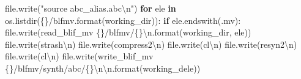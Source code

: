 \documentclass[
  italian,
]{book}
\newenvironment{Shaded}{\begin{snugshade}}{\end{snugshade}}
\newcommand{\BuiltInTok}[1]{#1}
\newcommand{\CharTok}[1]{\textcolor[rgb]{0.31,0.60,0.02}{#1}}
\newcommand{\ControlFlowTok}[1]{\textcolor[rgb]{0.13,0.29,0.53}{\textbf{#1}}}
\newcommand{\KeywordTok}[1]{\textcolor[rgb]{0.13,0.29,0.53}{\textbf{#1}}}
\newcommand{\NormalTok}[1]{#1}
\newcommand{\SpecialCharTok}[1]{\textcolor[rgb]{0.00,0.00,0.00}{#1}}
\newcommand{\StringTok}[1]{\textcolor[rgb]{0.31,0.60,0.02}{#1}}
\begin{document}
\begin{Shaded}
\begin{Highlighting}[]
    \BuiltInTok{file}\NormalTok{.write(}\StringTok{"source abc\_alias.abc}\CharTok{\textbackslash{}n}\StringTok{"}\NormalTok{)}
    \ControlFlowTok{for}\NormalTok{ ele }\KeywordTok{in}\NormalTok{ os.listdir(}\StringTok{\textquotesingle{}}\SpecialCharTok{\{\}}\StringTok{/blfmv\textquotesingle{}}\NormalTok{.}\BuiltInTok{format}\NormalTok{(working\_dir)):}
      \ControlFlowTok{if}\NormalTok{ ele.endswith(}\StringTok{\textquotesingle{}.mv\textquotesingle{}}\NormalTok{):}
        \BuiltInTok{file}\NormalTok{.write(}\StringTok{\textquotesingle{}read\_blif\_mv }\SpecialCharTok{\{\}}\StringTok{/blfmv/}\SpecialCharTok{\{\}}\CharTok{\textbackslash{}n}\StringTok{\textquotesingle{}}\NormalTok{.}\BuiltInTok{format}\NormalTok{(working\_dir, ele))}
        \BuiltInTok{file}\NormalTok{.write(}\StringTok{\textquotesingle{}strash}\CharTok{\textbackslash{}n}\StringTok{\textquotesingle{}}\NormalTok{)}
        \BuiltInTok{file}\NormalTok{.write(}\StringTok{\textquotesingle{}compress2}\CharTok{\textbackslash{}n}\StringTok{\textquotesingle{}}\NormalTok{)}
        \BuiltInTok{file}\NormalTok{.write(}\StringTok{\textquotesingle{}cl}\CharTok{\textbackslash{}n}\StringTok{\textquotesingle{}}\NormalTok{)}
        \BuiltInTok{file}\NormalTok{.write(}\StringTok{\textquotesingle{}resyn2}\CharTok{\textbackslash{}n}\StringTok{\textquotesingle{}}\NormalTok{)}
        \BuiltInTok{file}\NormalTok{.write(}\StringTok{\textquotesingle{}cl}\CharTok{\textbackslash{}n}\StringTok{\textquotesingle{}}\NormalTok{)}
        \BuiltInTok{file}\NormalTok{.write(}\StringTok{\textquotesingle{}write\_blif\_mv }\SpecialCharTok{\{\}}\StringTok{/blfmv/synth/abc/}\SpecialCharTok{\{\}}\CharTok{\textbackslash{}n\textbackslash{}n}\StringTok{\textquotesingle{}}\NormalTok{.}\BuiltInTok{format}\NormalTok{(working\_dele))}
  

\end{Highlighting}
\end{Shaded}
\end{document}
